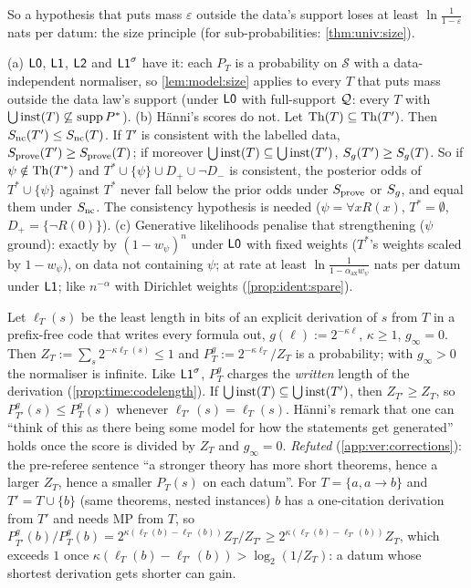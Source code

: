 So a hypothesis that puts mass $\varepsilon$ outside the data's support loses at least $\ln\frac1{1-\varepsilon}$ nats per datum: the size principle \citep{tenenbaum2001generalization} (for sub-probabilities: \cref{thm:univ:size}).

\begin{proposition}\label{prop:model:whichsize}
(a) $\mathord{\mathsf{L0}}$, $\mathord{\mathsf{L1}}$, $\mathord{\mathsf{L2}}$ and $\mathord{\mathsf{L1}}^{\sigma}$ have it: each $P_T$ is a probability on $\mathcal S$ with a data-independent normaliser, so \cref{lem:model:size} applies to every $T$ that puts mass outside the data law's support (under $\mathord{\mathsf{L0}}$ with full-support $\mathcal{Q}$: every $T$ with $\bigcup\mathrm{inst}(T)\not\subseteq\operatorname{supp}P^*$).
(b) H\"anni's scores do not. Let $\mathrm{Th}(T)\subseteq\mathrm{Th}(T')$. Then $S_{\mathrm{nc}}(T')\le S_{\mathrm{nc}}(T)$. If $T'$ is consistent with the labelled data, $S_{\mathrm{prove}}(T')\ge S_{\mathrm{prove}}(T)$; if moreover $\bigcup\mathrm{inst}(T)\subseteq\bigcup\mathrm{inst}(T')$, $S_{g}(T')\ge S_{g}(T)$. So if $\psi\notin\mathrm{Th}(T^*)$ and $T^*\cup\{\psi\}\cup D_+\cup\neg D_-$ is consistent, the posterior odds of $T^*\cup\{\psi\}$ against $T^*$ never fall below the prior odds under $S_{\mathrm{prove}}$ or $S_{g}$, and equal them under $S_{\mathrm{nc}}$. The consistency hypothesis is needed ($\psi=\forall xR(x)$, $T^*=\emptyset$, $D_+=\{\neg R(0)\}$).
(c) Generative likelihoods penalise that strengthening ($\psi$ ground): exactly by $(1-w_\psi)^n$ under $\mathord{\mathsf{L0}}$ with fixed weights ($T^*$'s weights scaled by $1-w_\psi$), on data not containing $\psi$; at rate at least $\ln\frac1{1-\alpha_{\mathrm{ax}}w_\psi}$ nats per datum under $\mathord{\mathsf{L1}}$; like $n^{-\alpha}$ with Dirichlet weights (\cref{prop:ident:spare}).
\end{proposition}

\begin{remark}\label{rem:model:graded}
Let $\ell_T(s)$ be the least length in bits of an explicit derivation of $s$ from $T$ in a prefix-free code that writes every formula out, $g(\ell):=2^{-\kappa\ell}$, $\kappa\ge1$, $g_\infty=0$. Then $Z_T:=\sum_s2^{-\kappa\ell_T(s)}\le1$ and $P^g_T:=2^{-\kappa\ell_T}/Z_T$ is a probability; with $g_\infty>0$ the normaliser is infinite. Like $\mathord{\mathsf{L1}}^{\sigma}$, $P^g_T$ charges the \emph{written} length of the derivation (\cref{prop:time:codelength}). If $\bigcup\mathrm{inst}(T)\subseteq\bigcup\mathrm{inst}(T')$, then $Z_{T'}\ge Z_T$, so $P^g_{T'}(s)\le P^g_T(s)$ whenever $\ell_{T'}(s)=\ell_T(s)$. H\"anni's remark that one can ``think of this as there being some model for how the statements get generated'' holds once the score is divided by $Z_T$ and $g_\infty=0$.
\emph{Refuted} (\cref{app:ver:corrections}): the pre-referee sentence ``a stronger theory has more short theorems, hence a larger $Z_T$, hence a smaller $P_T(s)$ on each datum''. For $T=\{a,a\to b\}$ and $T'=T\cup\{b\}$ (same theorems, nested instances) $b$ has a one-citation derivation from $T'$ and needs MP from $T$, so $P^g_{T'}(b)/P^g_T(b)=2^{\kappa(\ell_T(b)-\ell_{T'}(b))}Z_T/Z_{T'}\ge2^{\kappa(\ell_T(b)-\ell_{T'}(b))}Z_T$, which exceeds $1$ once $\kappa(\ell_T(b)-\ell_{T'}(b))>\log_2(1/Z_T)$: a datum whose shortest derivation gets shorter can gain.
\end{remark}


